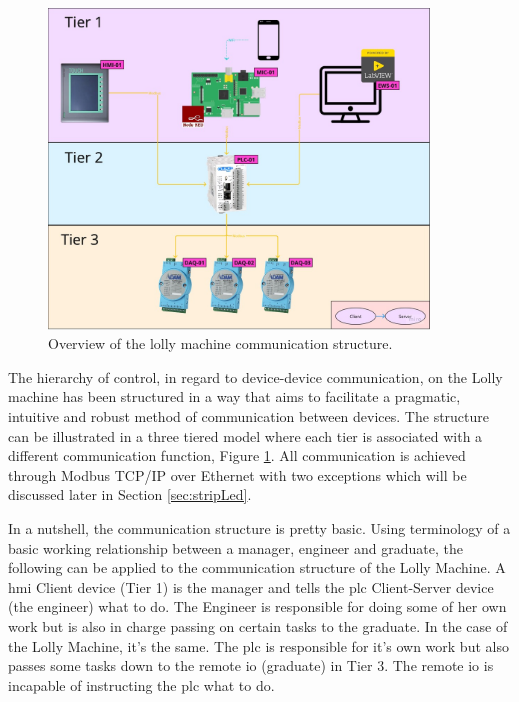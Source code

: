         \begin{figure}[H]
            \centering
            \includegraphics[width = 0.9\textwidth]{2_images/networkArcitecture.jpg}
            \caption{Overview of the lolly machine communication structure.}
            \label{fig:networkArcitecture}
        \end{figure}     
        
        The hierarchy of control, in regard to device-device communication, on the Lolly machine has been structured in a way that aims to facilitate a pragmatic, intuitive and robust method of communication between devices. The structure can be illustrated in a three tiered model where each tier is associated with a different communication function, Figure \ref{fig:networkArcitecture}. All communication is achieved through Modbus TCP/IP over Ethernet with two exceptions which will be discussed later in Section \ref{sec:stripLed}.

        In a nutshell, the communication structure is pretty basic. Using terminology of a basic working relationship between a manager,  engineer and graduate,  the following can be applied to the communication structure of the Lolly Machine. A \acrshort{hmi} Client device (Tier 1) is the manager and tells the \acrshort{plc} Client-Server device (the engineer) what to do. The Engineer is responsible for doing some of her own work but is also in charge passing on certain tasks to the graduate. In the case of the Lolly Machine, it’s the same. The \acrshort{plc} is responsible for it’s own work but also passes some tasks down to the remote \acrshort{io} (graduate) in Tier 3. The remote \acrshort{io} is incapable of instructing the \acrshort{plc} what to do. 

